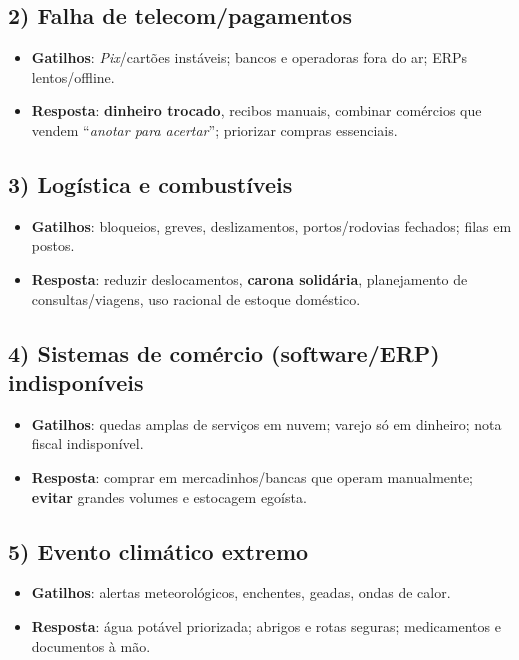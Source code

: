 \subsection*{2) Falha de telecom/pagamentos}
\begin{itemize}[leftmargin=*,noitemsep]
  \item \textbf{Gatilhos}: \emph{Pix}/cartões instáveis; bancos e operadoras fora do ar; ERPs lentos/offline.
  \item \textbf{Resposta}: \textbf{dinheiro trocado}, recibos manuais, combinar comércios que vendem ``\emph{anotar para acertar}''; priorizar compras essenciais.
\end{itemize}

\subsection*{3) Logística e combustíveis}
\begin{itemize}[leftmargin=*,noitemsep]
  \item \textbf{Gatilhos}: bloqueios, greves, deslizamentos, portos/rodovias fechados; filas em postos.
  \item \textbf{Resposta}: reduzir deslocamentos, \textbf{carona solidária}, planejamento de consultas/viagens, uso racional de estoque doméstico.
\end{itemize}

\subsection*{4) Sistemas de comércio (software/ERP) indisponíveis}
\begin{itemize}[leftmargin=*,noitemsep]
  \item \textbf{Gatilhos}: quedas amplas de serviços em nuvem; varejo só em dinheiro; nota fiscal indisponível.
  \item \textbf{Resposta}: comprar em mercadinhos/bancas que operam manualmente; \textbf{evitar} grandes volumes e estocagem egoísta.
\end{itemize}

\subsection*{5) Evento climático extremo}
\begin{itemize}[leftmargin=*,noitemsep]
  \item \textbf{Gatilhos}: alertas meteorológicos, enchentes, geadas, ondas de calor.
  \item \textbf{Resposta}: água potável priorizada; abrigos e rotas seguras; medicamentos e documentos à mão.
\end{itemize}

